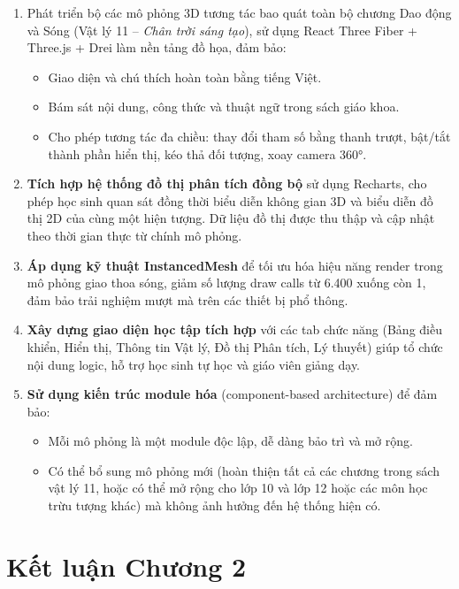 \begin{enumerate}
    \item Phát triển bộ các mô phỏng 3D tương tác bao quát toàn bộ chương Dao động và Sóng (Vật lý 11 – \textit{Chân trời sáng tạo}), sử dụng React Three Fiber + Three.js + Drei làm nền tảng đồ họa, đảm bảo:
    \begin{itemize}
        \item Giao diện và chú thích hoàn toàn bằng tiếng Việt.
        \item Bám sát nội dung, công thức và thuật ngữ trong sách giáo khoa.
        \item Cho phép tương tác đa chiều: thay đổi tham số bằng thanh trượt, bật/tắt thành phần hiển thị, kéo thả đối tượng, xoay camera 360°.
    \end{itemize}
    
    \item \textbf{Tích hợp hệ thống đồ thị phân tích đồng bộ} sử dụng Recharts, cho phép học sinh quan sát đồng thời biểu diễn không gian 3D và biểu diễn đồ thị 2D của cùng một hiện tượng. Dữ liệu đồ thị được thu thập và cập nhật theo thời gian thực từ chính mô phỏng.
    
    \item \textbf{Áp dụng kỹ thuật InstancedMesh} để tối ưu hóa hiệu năng render trong mô phỏng giao thoa sóng, giảm số lượng draw calls từ 6.400 xuống còn 1, đảm bảo trải nghiệm mượt mà trên các thiết bị phổ thông.
    
    \item \textbf{Xây dựng giao diện học tập tích hợp} với các tab chức năng (Bảng điều khiển, Hiển thị, Thông tin Vật lý, Đồ thị Phân tích, Lý thuyết) giúp tổ chức nội dung logic, hỗ trợ học sinh tự học và giáo viên giảng dạy.
    
    \item \textbf{Sử dụng kiến trúc module hóa} (component-based architecture) để đảm bảo:
    \begin{itemize}
        \item Mỗi mô phỏng là một module độc lập, dễ dàng bảo trì và mở rộng.
        \item Có thể bổ sung mô phỏng mới (hoàn thiện tất cả các chương trong sách vật lý 11, hoặc có thể mở rộng cho lớp 10 và lớp 12 hoặc các môn học trừu tượng khác) mà không ảnh hưởng đến hệ thống hiện có.
    \end{itemize}
\end{enumerate}

\section{Kết luận Chương 2}

